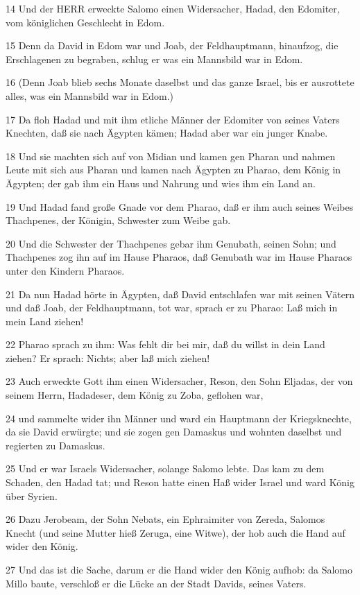 \par 14 Und der HERR erweckte Salomo einen Widersacher, Hadad, den Edomiter, vom königlichen Geschlecht in Edom.
\par 15 Denn da David in Edom war und Joab, der Feldhauptmann, hinaufzog, die Erschlagenen zu begraben, schlug er was ein Mannsbild war in Edom.
\par 16 (Denn Joab blieb sechs Monate daselbst und das ganze Israel, bis er ausrottete alles, was ein Mannsbild war in Edom.)
\par 17 Da floh Hadad und mit ihm etliche Männer der Edomiter von seines Vaters Knechten, daß sie nach Ägypten kämen; Hadad aber war ein junger Knabe.
\par 18 Und sie machten sich auf von Midian und kamen gen Pharan und nahmen Leute mit sich aus Pharan und kamen nach Ägypten zu Pharao, dem König in Ägypten; der gab ihm ein Haus und Nahrung und wies ihm ein Land an.
\par 19 Und Hadad fand große Gnade vor dem Pharao, daß er ihm auch seines Weibes Thachpenes, der Königin, Schwester zum Weibe gab.
\par 20 Und die Schwester der Thachpenes gebar ihm Genubath, seinen Sohn; und Thachpenes zog ihn auf im Hause Pharaos, daß Genubath war im Hause Pharaos unter den Kindern Pharaos.
\par 21 Da nun Hadad hörte in Ägypten, daß David entschlafen war mit seinen Vätern und daß Joab, der Feldhauptmann, tot war, sprach er zu Pharao: Laß mich in mein Land ziehen!
\par 22 Pharao sprach zu ihm: Was fehlt dir bei mir, daß du willst in dein Land ziehen? Er sprach: Nichts; aber laß mich ziehen!
\par 23 Auch erweckte Gott ihm einen Widersacher, Reson, den Sohn Eljadas, der von seinem Herrn, Hadadeser, dem König zu Zoba, geflohen war,
\par 24 und sammelte wider ihn Männer und ward ein Hauptmann der Kriegsknechte, da sie David erwürgte; und sie zogen gen Damaskus und wohnten daselbst und regierten zu Damaskus.
\par 25 Und er war Israels Widersacher, solange Salomo lebte. Das kam zu dem Schaden, den Hadad tat; und Reson hatte einen Haß wider Israel und ward König über Syrien.
\par 26 Dazu Jerobeam, der Sohn Nebats, ein Ephraimiter von Zereda, Salomos Knecht (und seine Mutter hieß Zeruga, eine Witwe), der hob auch die Hand auf wider den König.
\par 27 Und das ist die Sache, darum er die Hand wider den König aufhob: da Salomo Millo baute, verschloß er die Lücke an der Stadt Davids, seines Vaters.
